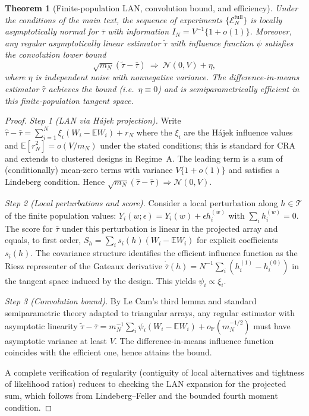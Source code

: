\documentclass[aos]{imsart}
\newtheorem{theorem}{Theorem}
\theoremstyle{definition}
\theoremstyle{plain}
\begin{document}
\begin{theorem}[Finite-population LAN, convolution bound, and efficiency]\label{thm:semi-eff-proof}
Under the conditions of the main text, the sequence of experiments $\{\mathcal E_N^\mathrm{full}\}$ is locally asymptotically normal for $\bar\tau$
with information $I_N=V^{-1}\{1+o(1)\}$.
Moreover, any regular asymptotically linear estimator $\tilde\tau$ with influence function $\psi$ satisfies the convolution lower bound
\[
\sqrt{m_N}(\tilde\tau-\bar\tau)\ \Rightarrow\ \mathcal N(0, V)+\eta,
\]
where $\eta$ is independent noise with nonnegative variance. The difference-in-means estimator $\hat\tau$ achieves the bound (i.e.\ $\eta\equiv 0$)
and is semiparametrically efficient in this finite-population tangent space.
\end{theorem}

\begin{proof}
\emph{Step 1 (LAN via Hájek projection).}
Write $\hat\tau-\bar\tau=\sum_{i=1}^N \xi_i (W_i-\mathbb EW_i)+r_N$ where the $\xi_i$ are the Hájek influence values and
$\mathbb E[r_N^2]=o(V/m_N)$ under the stated conditions; this is standard for CRA and extends to clustered designs in Regime~A.
The leading term is a sum of (conditionally) mean-zero terms with variance $V\{1+o(1)\}$ and satisfies a Lindeberg condition.
Hence $\sqrt{m_N}(\hat\tau-\bar\tau)\Rightarrow \mathcal N(0,V)$.

\emph{Step 2 (Local perturbations and score).}
Consider a local perturbation along $h\in\mathcal T$ of the finite population values:
$Y_i(w;\epsilon)=Y_i(w)+\epsilon h_i^{(w)}$ with $\sum_i h_i^{(w)}=0$.
The score for $\bar\tau$ under this perturbation is linear in the projected array and equals, to first order,
$S_h=\sum_i s_i(h)(W_i-\mathbb EW_i)$ for explicit coefficients $s_i(h)$.
The covariance structure identifies the efficient influence function as the Riesz representer of the Gateaux derivative
$\dot{\bar\tau}(h)=N^{-1}\sum_i (h_i^{(1)}-h_i^{(0)})$ in the tangent space induced by the design.
This yields $\psi_i\propto \xi_i$.

\emph{Step 3 (Convolution bound).}
By Le Cam's third lemma and standard semiparametric theory adapted to triangular arrays,
any regular estimator with asymptotic linearity $\tilde\tau-\bar\tau=m_N^{-1}\sum_i \psi_i(W_i-\mathbb EW_i)+o_{\mathbb P}(m_N^{-1/2})$
must have asymptotic variance at least $V$.
The difference-in-means influence function coincides with the efficient one, hence attains the bound.

A complete verification of regularity (contiguity of local alternatives and tightness of likelihood ratios) reduces to
checking the LAN expansion for the projected sum, which follows from Lindeberg--Feller and the bounded fourth moment condition.
\end{proof}
\end{document}
